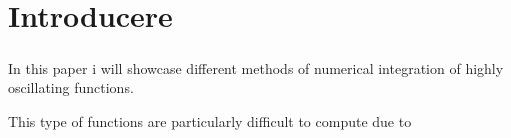 \chapter{Introducere}

\paragraph{} In this paper i will showcase different methods of numerical integration of highly oscillating functions.

This type \cite{book1}of functions are particularly difficult to compute due to 


